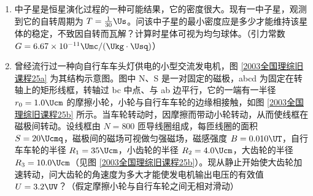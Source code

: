 \documentclass[\gkver]{gaokaozhenti}
\begin{document}
\begin{enumerate}
{

（2）作出 $U-I$ 图线，舍去左起第 2 点，其余 5 个点在一条直线上，不在这条线上的点尽量均匀分布在直线两侧；求该直线的斜率 $k$，则 $R=k=229\UO$（$221\sim237\UO$ 均为正确）。

（3）因为游标为 50 分度，所以游标卡尺的精确度为 $\frac{1}{50}\Umm=0.02\Umm$，另外游标卡尺不需要估读，读出待测电阻的长度为 $0.800\Ucm$，直径为 $1\Umm+47\times0.02\Umm=1.94\Umm=0.194\Ucm$。

（4）将数据代入 $\rho=\frac{RS}{l}=R\frac{\pi d^{2}}{4l}$，得 $\rho=8.46\times10^{-2}\UOm$。
}

\item
中子星是恒星演化过程的一种可能结果，它的密度很大。现有一中子星，观测到它的自转周期为 $T=\frac{1}{30}\Us$。问该中子星的最小密度应是多少才能维持该星体的稳定，不致因自转而瓦解？计算时星体可视为均匀球体。（引力常数 $G=6.67\times10^{-11}\Umc/(\Ukg\cdot\Usq)$）


\item
曾经流行过一种向自行车车头灯供电的小型交流发电机，图 \ref{2003全国理综旧课程25a} 为其结构示意图。图中 N、S 是一对固定的磁极，abcd 为固定在转轴上的矩形线框，转轴过 bc 中点、与 ab 边平行，它的一端有一半径 $r_{0}=1.0\Ucm$ 的摩擦小轮，小轮与自行车车轮的边缘相接触，如图 \ref{2003全国理综旧课程25b} 所示。当车轮转动时，因摩擦而带动小轮转动，从而使线框在磁极间转动。设线框由 $N=800$ 匝导线圈组成，每匝线圈的面积 $S=20\Ucmq$，磁极间的磁场可视做匀强磁场，磁感强度 $B=0.010\UT$，自行车车轮的半径 $R_{1}=35\Ucm$，小齿轮的半径 $R_{2}=4.0\Ucm$，大齿轮的半径 $R_{3}=10.0\Ucm$（见图 \ref{2003全国理综旧课程25b}）。现从静止开始使大齿轮加速转动，问大齿轮的角速度为多大才能使发电机输出电压的有效值 $U=3.2\UV$？（假定摩擦小轮与自行车轮之间无相对滑动）


\end{enumerate}
\end{document}
